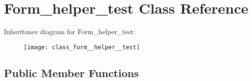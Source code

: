 \hypertarget{class_form__helper__test}{}\section{Form\+\_\+helper\+\_\+test Class Reference}
\label{class_form__helper__test}
Inheritance diagram for Form\+\_\+helper\+\_\+test\+:\begin{figure}[H]
\begin{center}
\leavevmode
\texttt{[image: class\_form\_\_helper\_\_test]}
\end{center}
\end{figure}
\subsection*{Public Member Functions}
